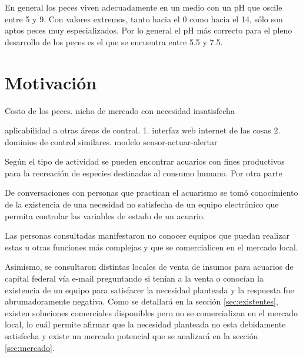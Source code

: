 En general los peces viven adecuadamente en un medio con un pH que oscile entre 5 y 9. Con valores extremos, tanto hacia el 0 como hacia el 14, sólo son aptos peces muy especializados. Por lo general el pH más correcto para el pleno desarrollo de los peces es el que se encuentra entre 5.5 y 7.5. 

%
%



\section{Motivación}

Costo de los peces.  nicho de mercado con necesidad insatisfecha

aplicabilidad a otras áreas de control.
1. interfaz web internet de las cosas
2. dominios de control similares. modelo sensor-actuar-alertar

Según el tipo de actividad se pueden encontrar acuarios con fines productivos para la recreación de especies destinadas al consumo humano.  Por otra parte

De conversaciones con personas que practican el acuarismo se tomó conocimiento de la existencia de una necesidad no satisfecha de un equipo electrónico que permita controlar las variables de estado de un acuario. 
 
Las personas consultadas manifestaron no conocer equipos que puedan realizar estas u otras funciones más complejas y que se comercialicen en el mercado local.  

Asimismo, se consultaron distintas locales de venta de insumos para acuarios de capital federal vía e-mail preguntando si tenían a la venta o conocían la existencia de un equipo para satisfacer la necesidad planteada y la respuesta fue abrumadoramente negativa. Como se detallará en la sección \ref{sec:existentes}, existen soluciones comerciales disponibles pero no se comercializan en el mercado local, lo cuál permite afirmar que la necesidad planteada no esta debidamente satisfecha y existe un mercado potencial que se analizará en la sección \ref{sec:mercado}.

